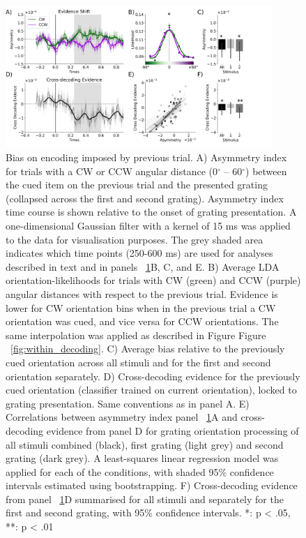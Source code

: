 \documentclass{article}
\begin{document}
\begin{figure}
\centering\includegraphics[width=0.9\textwidth]{figures/figure6_between_trial_decoding} 
\caption[Bias on encoding imposed by previous trial.]{Bias on encoding imposed by previous trial. A) Asymmetry index for trials with a CW or CCW angular distance (0$^{\circ}$ – 60$^{\circ}$) between the cued item on the previous trial and the presented grating (collapsed across the first and second grating). Asymmetry index time course is shown relative to the onset of grating presentation. A one-dimensional Gaussian filter with a kernel of 15 ms was applied to the data for visualisation purposes. The grey shaded area indicates which time points (250-600 ms) are used for analyses described in text and in panels ~\ref{fig:between_decoding}B, C, and E. B) Average LDA orientation-likelihoods for trials with CW (green) and CCW (purple) angular distances with respect to the previous trial. Evidence is lower for CW orientation bins when in the previous trial a CW orientation was cued, and vice versa for CCW orientations. The same interpolation was applied as described in Figure Figure ~\ref{fig:within_decoding}. C) Average bias relative to the previously cued orientation across all stimuli and for the first and second orientation separately. D) Cross-decoding evidence for the previously cued orientation (classifier trained on current orientation), locked to grating presentation. Same conventions as in panel A. E) Correlations between asymmetry index panel ~\ref{fig:between_decoding}A and cross-decoding evidence from panel D for grating orientation processing of all stimuli combined (black), first grating (light grey) and second grating (dark grey). A least-squares linear regression model was applied for each of the conditions, with shaded 95\% confidence intervals estimated using bootstrapping. F) Cross-decoding evidence from panel ~\ref{fig:between_decoding}D summarised for all stimuli and separately for the first and second grating, with 95\% confidence intervals. *: p < .05, **: p < .01}
\label{fig:between_decoding}\end{figure}
\end{document}
